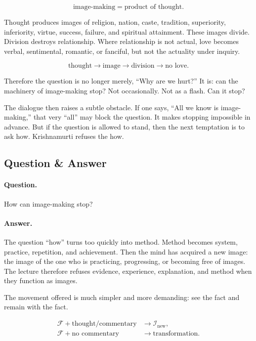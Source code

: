 \begin{equation}
\text{image-making} = \text{product of thought}.
\end{equation}

Thought produces images of religion, nation, caste, tradition, superiority, inferiority, virtue, success, failure, and spiritual attainment. These images divide. Division destroys relationship. Where relationship is not actual, love becomes verbal, sentimental, romantic, or fanciful, but not the actuality under inquiry.

\begin{equation}
\text{thought} \to \text{image} \to \text{division} \to \text{no love}.
\end{equation}

Therefore the question is no longer merely, ``Why are we hurt?'' It is: can the machinery of image-making stop? Not occasionally. Not as a flash. Can it stop?

The dialogue then raises a subtle obstacle. If one says, ``All we know is image-making,'' that very ``all'' may block the question. It makes stopping impossible in advance. But if the question is allowed to stand, then the next temptation is to ask how. Krishnamurti refuses the how.

\subsection{Question \& Answer}

\paragraph{Question.}
How can image-making stop?

\paragraph{Answer.}
The question ``how'' turns too quickly into method. Method becomes system, practice, repetition, and achievement. Then the mind has acquired a new image: the image of the one who is practicing, progressing, or becoming free of images. The lecture therefore refuses evidence, experience, explanation, and method when they function as images.

The movement offered is much simpler and more demanding: see the fact and remain with the fact.

\begin{align}
\mathcal{F} + \text{thought/commentary}
&\to \mathcal{I}_{\text{new}}, \\
\mathcal{F} + \text{no commentary}
&\to \text{transformation}.
\end{align}


